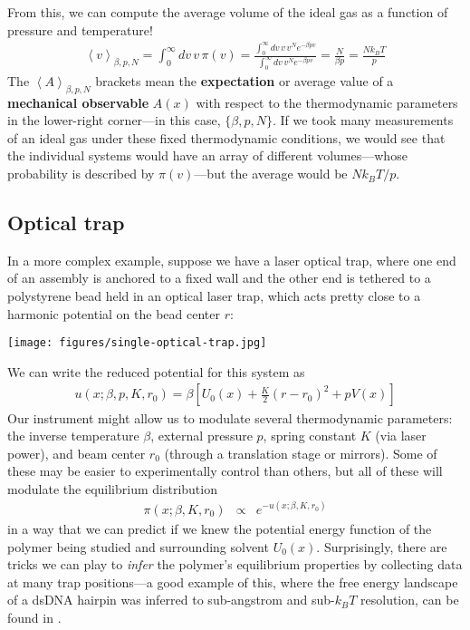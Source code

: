 \documentclass[english,course]{lecture}
\begin{document}
From this, we can compute the average volume of the ideal gas as a function of pressure and temperature!
\begin{eqnarray}
\left< v \right>_{\beta, p, N} = \int_0^\infty dv \, v \, \pi(v) = \frac{\int_0^\infty dv \, v \, v^N e^{-\beta p v}}{\int_0^\infty dv \, v^N e^{-\beta p v}} = \frac{N}{\beta p} = \frac{N k_B T}{p}
\end{eqnarray}
The $\left< A \right>_{\beta, p, N}$ brackets mean the {\bf expectation} or average value of a {\bf mechanical observable} $A(x)$ with respect to the thermodynamic parameters in the lower-right corner---in this case, $\{\beta, p, N\}$.
If we took many measurements of an ideal gas under these fixed thermodynamic conditions, we would see that the individual systems would have an array of different volumes---whose probability is described by $\pi(v)$---but the average would be $N k_B T / p$.

\subsection{Optical trap}

In a more complex example, suppose we have a laser optical trap, where one end of an assembly is anchored to a fixed wall and the other end is tethered to a polystyrene bead held in an optical laser trap, which acts pretty close to a harmonic potential on the bead center $r$:

\begin{centering}
\texttt{[image: figures/single-optical-trap.jpg]}

\end{centering}

We can write the reduced potential for this system as
\begin{eqnarray}
u(x; \beta, p, K, r_0) = \beta \left[ U_0(x) + \frac{K}{2} (r - r_0)^2 + p V(x) \right]
\end{eqnarray}
Our instrument might allow us to modulate several thermodynamic parameters: the inverse temperature $\beta$, external pressure $p$, spring constant $K$ (via laser power), and beam center $r_0$ (through a translation stage or mirrors).
Some of these may be easier to experimentally control than others, but all of these will modulate the equilibrium distribution
\begin{eqnarray}
\pi(x; \beta, K, r_0) &\propto& e^{-u(x; \beta, K, r_0)}
\end{eqnarray}
in a way that we can predict if we knew the potential energy function of the polymer being studied and surrounding solvent $U_0(x)$.
Surprisingly, there are tricks we can play to \emph{infer} the polymer's equilibrium properties by collecting data at many trap positions---a good example of this, where the free energy landscape of a dsDNA hairpin was inferred to sub-angstrom and sub-$k_B T$ resolution, can be found in \cite{shirts2008statistically}.
\end{document}
